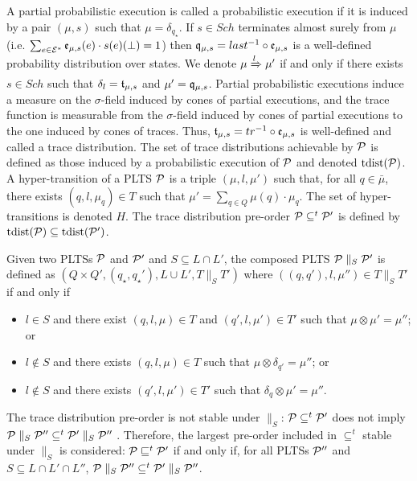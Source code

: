 A partial probabilistic execution is called a probabilistic execution if it is induced by a pair
$(\mu,s)$ such that $\mu = \delta_{q_\star}$. If $s \in Sch$ terminates almost surely from $\mu$
(i.e. $\sum_{e \in \mathcal{E}^*} \mathfrak{e}_{\mu,s}(e)\cdot s(e)(\bot) = 1$) then
$\mathfrak{q}_{\mu,s} = last^{-1}\circ\mathfrak{e}_{\mu,s}$ is a well-defined probability distribution over
states. We denote $\mu \xRightarrow{l} \mu'$ if and only if there exists $s \in Sch$ such that
$\delta_l = \mathfrak{t}_{\mu,s}$ and $\mu' = \mathfrak{q}_{\mu,s}$. Partial probabilistic executions induce a
measure on the $\sigma$-field induced by cones of partial executions, and the trace function is
measurable from the $\sigma$-field induced by cones of partial executions to the one induced by
cones of traces. Thus, $\mathfrak{t}_{\mu,s} = tr^{-1}\circ\mathfrak{e}_{\mu,s}$ is well-defined and called a
trace distribution. The set of trace distributions achievable by $\mathcal{P}$ is defined as those
induced by a probabilistic execution of $\mathcal{P}$ and denoted $ \text{tdist}(\mathcal{P})$.
A hyper-transition of a PLTS $\mathcal{P}$ is a triple $(\mu,l,\mu')$ such that, for all $q \in \bar\mu$,
there exists $(q,l,\mu_q) \in T$ such that $\mu' = \sum_{q \in Q}\mu(q)\cdot\mu_q$.
The set of hyper-transitions is denoted $H$.
The trace distribution pre-order $\mathcal{P} \subseteq^t \mathcal{P}'$ is defined by
$ \text{tdist}(\mathcal{P}) \subseteq  \text{tdist}(\mathcal{P}')$.

\begin{definition}

    Given two PLTSs $\mathcal{P}$ and $\mathcal{P}'$ and $S \subseteq L \cap L'$, the composed PLTS
    $\mathcal{P} \parallel_S \mathcal{P}'$ is defined as
    $(Q \times Q', (q_\star, q_\star'), L \cup L', T \parallel_S T')$ where
    $((q,q'), l, \mu'') \in T \parallel_S T'$ if and only if
    \begin{itemize}
        \item $l \in S$ and there exist $(q,l,\mu) \in T$ and $(q',l,\mu') \in T'$ such that
        $\mu \otimes \mu' = \mu''$; or
        \item $l \not\in S$ and there exists $(q,l,\mu) \in T$ such that
        $\mu \otimes \delta_{q'} = \mu''$; or
        \item $l \not\in S$ and there exists $(q',l,\mu') \in T'$ such that
        $\delta_q \otimes \mu' = \mu''$.
    \end{itemize}
\end{definition}

The trace distribution pre-order is not stable under $\parallel_S$: $\mathcal{P} \subseteq^t \mathcal{P}'$ does
not imply $\mathcal{P} \parallel_S \mathcal{P}'' \subseteq^t \mathcal{P}' \parallel_S \mathcal{P}''$
\cite{Segala1995Compositional}.
Therefore, the largest pre-order included in $\subseteq^t$ stable under $\parallel_S$ is considered:
$\mathcal{P} \sqsubseteq^t \mathcal{P}'$ if and only if, for all PLTSs $\mathcal{P}''$ and
$S \subseteq L \cap L' \cap L''$,
$\mathcal{P} \parallel_S \mathcal{P}'' \subseteq^t \mathcal{P}' \parallel_S \mathcal{P}''$.

